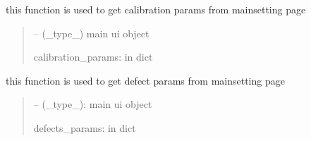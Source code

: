 \documentclass[letterpaper,10pt,english]{sphinxmanual}
\begin{document}

\begin{savenotes}\begin{fulllineitems}
\label{\detokenize{setting/backend/mainsetting_funcs:oxin.backend.mainsetting_funcs.get_calibration_params_from_ui}}
\pysigstartsignatures
{}
\pysigstopsignatures
\sphinxAtStartPar
this function is used to get calibration params from main\sphinxhyphen{}setting page
\begin{quote}\begin{description}
\sphinxAtStartPar
{} – (\_type\_) main ui object

\sphinxAtStartPar
calibration\_params: in dict

\end{description}\end{quote}

\end{fulllineitems}\end{savenotes}


\begin{savenotes}\begin{fulllineitems}
\label{\detokenize{setting/backend/mainsetting_funcs:oxin.backend.mainsetting_funcs.get_defects_params_from_ui}}
\pysigstartsignatures
{}
\pysigstopsignatures
\sphinxAtStartPar
this function is used to get defect params from main\sphinxhyphen{}setting page
\begin{quote}\begin{description}
\sphinxAtStartPar
{} – (\_type\_): main ui object

\sphinxAtStartPar
defects\_params: in dict

\end{description}\end{quote}

\end{fulllineitems}\end{savenotes}
\end{document}
